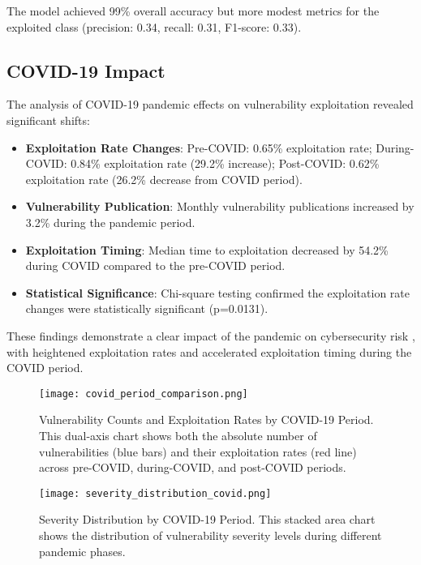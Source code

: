 \documentclass[runningheads]{llncs}
\begin{document}
The model achieved 99\% overall accuracy but more modest metrics for the exploited class (precision: 0.34, recall: 0.31, F1-score: 0.33). 

\subsection{COVID-19 Impact}
The analysis of COVID-19 pandemic effects on vulnerability exploitation revealed significant shifts:

\begin{itemize}
    \item \textbf{Exploitation Rate Changes}: Pre-COVID: 0.65\% exploitation rate; During-COVID: 0.84\% exploitation rate (29.2\% increase); Post-COVID: 0.62\% exploitation rate (26.2\% decrease from COVID period).
    
    \item \textbf{Vulnerability Publication}: Monthly vulnerability publications increased by 3.2\% during the pandemic period.
    
    \item \textbf{Exploitation Timing}: Median time to exploitation decreased by 54.2\% during COVID compared to the pre-COVID period.
    
    \item \textbf{Statistical Significance}: Chi-square testing confirmed the exploitation rate changes were statistically significant (p=0.0131).
\end{itemize}

These findings demonstrate a clear impact of the pandemic on cybersecurity risk \cite{covid_cybersecurity}, with heightened exploitation rates and accelerated exploitation timing during the COVID period.

\begin{figure}[H]
    \texttt{[image: covid\_period\_comparison.png]}
    \caption{Vulnerability Counts and Exploitation Rates by COVID-19 Period. This dual-axis chart shows both the absolute number of vulnerabilities (blue bars) and their exploitation rates (red line) across pre-COVID, during-COVID, and post-COVID periods.}
    \label{fig:covid_impact}
\end{figure}

\begin{figure}[htbp]
    \texttt{[image: severity\_distribution\_covid.png]}
    \caption{Severity Distribution by COVID-19 Period. This stacked area chart shows the distribution of vulnerability severity levels during different pandemic phases.}
    \label{fig:severity_distribution}
\end{figure}
\end{document}

